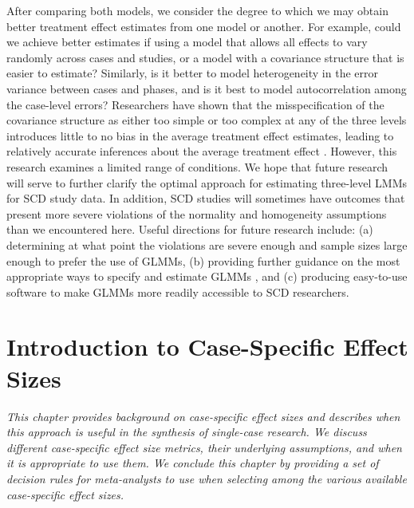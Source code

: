 \documentclass[
]{book}
\begin{document}
After comparing both models, we consider the degree to which we may obtain better treatment effect estimates from one model or another. For example, could we achieve better estimates if using a model that allows all effects to vary randomly across cases and studies, or a model with a covariance structure that is easier to estimate? Similarly, is it better to model heterogeneity in the error variance between cases and phases, and is it best to model autocorrelation among the case-level errors? Researchers have shown that the misspecification of the covariance structure as either too simple or too complex at any of the three levels introduces little to no bias in the average treatment effect estimates, leading to relatively accurate inferences about the average treatment effect \citep{baek_Ferron_2020, Joo_Ferron_2019, Moeyaert_Ugille_Ferron_Beretvas_VandenNoortgate_2013, Moeyaert_Ugille_Ferron_Beretvas_VanDenNoortgate_2016, Petit-Bois_2014, Petit-Bois_Baek_VandenNoortgate_Beretvas_Ferron_2016}. However, this research examines a limited range of conditions. We hope that future research will serve to further clarify the optimal approach for estimating three-level LMMs for SCD study data. In addition, SCD studies will sometimes have outcomes that present more severe violations of the normality and homogeneity assumptions than we encountered here. Useful directions for future research include: (a) determining at what point the violations are severe enough and sample sizes large enough to prefer the use of GLMMs, (b) providing further guidance on the most appropriate ways to specify and estimate GLMMs \citep{Li_Luo_Baek_Thompson_Lam_2023}, and (c) producing easy-to-use software to make GLMMs more readily accessible to SCD researchers.

\hypertarget{intro-case-specific-es}{%
\chapter{Introduction to Case-Specific Effect Sizes}\label{intro-case-specific-es}}


\emph{This chapter provides background on case-specific effect sizes and describes when this approach is useful in the synthesis of single-case research. We discuss different case-specific effect size metrics, their underlying assumptions, and when it is appropriate to use them. We conclude this chapter by providing a set of decision rules for meta-analysts to use when selecting among the various available case-specific effect sizes.}
\end{document}
